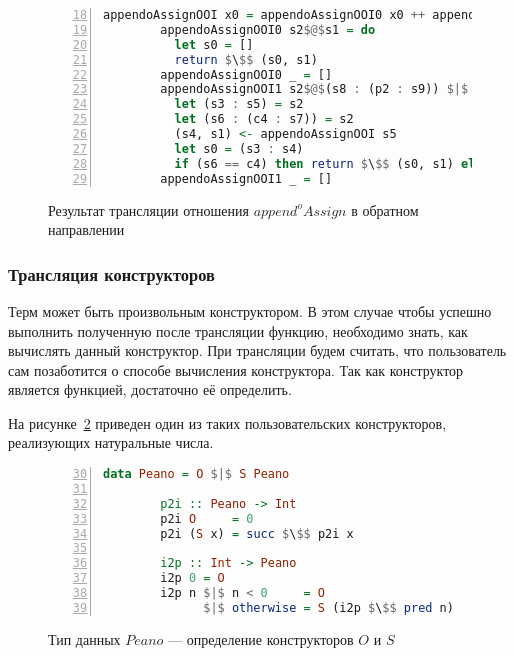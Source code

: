 \begin{figure}[h!]
  \begin{center}
  \begin{minipage}{1\textwidth}
  \begin{lstlisting}[language=Haskell, frame=single, numbers=left,numberstyle=\small, firstnumber=18, escapechar=|]
        appendoAssignOOI x0 = appendoAssignOOI0 x0 ++ appendoAssignOOI1 x0
        appendoAssignOOI0 s2$@$s1 = do
          let s0 = []
          return $\$$ (s0, s1)
        appendoAssignOOI0 _ = []
        appendoAssignOOI1 s2$@$(s8 : (p2 : s9)) $|$ s8 == p2 = do
          let (s3 : s5) = s2
          let (s6 : (c4 : s7)) = s2                 |\label{line:appendoAssignOOITR8}|
          (s4, s1) <- appendoAssignOOI s5
          let s0 = (s3 : s4)
          if (s6 == c4) then return $\$$ (s0, s1) else [] |\label{line:appendoAssignOOITR8}|
        appendoAssignOOI1 _ = []
    \end{lstlisting}
  \end{minipage}
  \end{center}
  \caption{Результат трансляции отношения $append^oAssign$ в обратном направлении}
  \label{lst:appendoAssignOOITR}
\end{figure}


\subsubsection{Трансляция конструкторов}

Терм \miniKanren{} может быть произвольным конструктором.
В этом случае чтобы успешно выполнить полученную после трансляции функцию, необходимо знать, как вычислять данный конструктор.
При трансляции будем считать, что пользователь сам позаботится о способе вычисления конструктора.
Так как конструктор является функцией, достаточно её определить.

На рисунке~\ref{lst:peano} приведен один из таких пользовательских конструкторов, реализующих натуральные числа.

\begin{figure}[h!]
  \begin{center}
  \begin{minipage}{0.7\textwidth}
  \begin{lstlisting}[language=Haskell, frame=single, numbers=left,numberstyle=\small, firstnumber=30, escapechar=|]
        data Peano = O $|$ S Peano
        
        p2i :: Peano -> Int
        p2i O     = 0
        p2i (S x) = succ $\$$ p2i x
        
        i2p :: Int -> Peano
        i2p 0 = O
        i2p n $|$ n < 0     = O
              $|$ otherwise = S (i2p $\$$ pred n)
    \end{lstlisting}
  \end{minipage}
  \end{center}
  \caption{Тип данных $Peano$ --- определение конструкторов $O$ и $S$}
  \label{lst:peano}
\end{figure}

